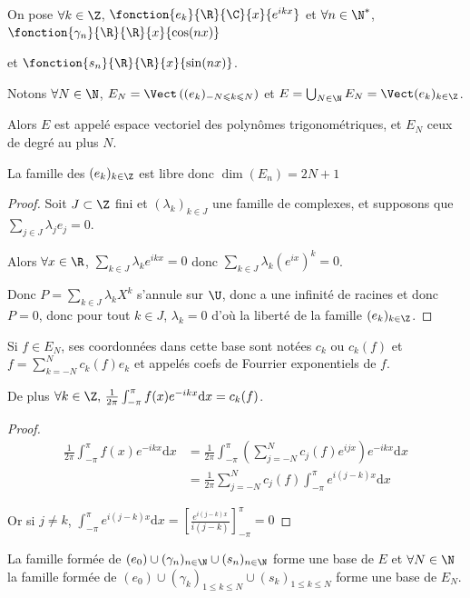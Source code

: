 On pose $\forall k \in \Z$, $\fonction{e_k}{\R}{\C}{x}{e^{ikx}}$ 
et $\forall n \in \N^*$, $\fonction{\gamma_n}{\R}{\R}{x}{\cos(nx)}$ 

et 
$\fonction{s_n}{\R}{\R}{x}{\sin(nx)}$.


Notons $\forall N \in \N$, $E_N = \Vect\left( (e_k)_{-N \leqslant k \leqslant N} \right)$ et 
$E = \bigcup_{N \in \N} E_N = \Vect(e_k)_{k \in \Z}$.

Alors $E$ est appelé espace vectoriel des polynômes trigonométriques, et 
$E_N$ ceux de degré au plus $N$.

La famille des $(e_k)_{k \in \Z}$ est libre donc $\dim(E_n) = 2N + 1$ 

\begin{proof}
    Soit $J \subset \Z$ fini et $(\lambda_k)_{k \in J}$ une famille de complexes, et supposons que 
     $\sum_{j \in J} \lambda_j e_j = 0$. 

     Alors $\forall x \in \R$, $\sum_{k \in J} \lambda_k e^{ikx} = 0$ 
    donc $\sum_{k \in J} \lambda_k (e^{ix}) ^k = 0$.

    Donc $P = \sum_{k \in J} \lambda_k X^k$ s'annule sur $\U$, donc a une 
    infinité de racines et donc $P = 0$, donc pour tout $k \in J$, $\lambda_k = 0$
    d'où la liberté de la famille $(e_k)_{k \in \Z}$.
\end{proof}

Si $f \in E_N$, ses coordonnées dans cette base sont notées $c_k$ ou $c_k(f)$ et 
$\displaystyle f = \sum_{k=-N}^N c_k(f) e_k$ et appelés coefs de Fourrier exponentiels 
de $f$.

De plus $\forall k \in \Z, \, \frac 1 {2 \pi} \int_{- \pi }^\pi f(x) e^{-ikx} \mathrm{d}x = c_k(f)$.

\begin{proof}
    \begin{align}
        \frac 1 {2 \pi} \int_{- \pi }^\pi f(x) e^{-ikx} \mathrm{d}x & = \frac 1 {2 \pi} \int_{- \pi }^\pi \left( \sum_{j=-N}^N c_j(f) e^{ijx} \right) e^{-ikx} \mathrm{d}x \\
        & = \frac 1 {2 \pi} \sum_{j=-N}^N c_j(f) \int_{- \pi }^\pi e^{i(j-k)x} \mathrm{d}x 
    \end{align}

    Or si $j \neq k$, $\int_{- \pi }^\pi e^{i(j-k)x} \mathrm{d}x = \left[ \frac{e^{i(j-k)x}}{i(j-k)} \right]_{- \pi }^\pi = 0$
\end{proof}

La famille formée de $(e_0) \cup (\gamma_n)_{n \in \N} \cup (s_n)_{n \in \N}$ forme une base de $E$ et 
$\forall N \in \N$ la famille formée de $(e_0) \cup (\gamma_k)_{1 \leqslant k \leqslant N} \cup (s_k)_{1 \leqslant k \leqslant N}$
forme une base de $E_N$.

